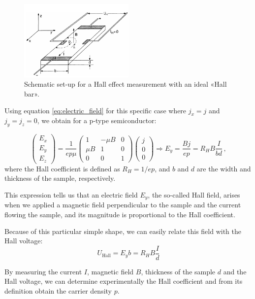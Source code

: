 \documentclass[11pt,a4paper]{article}
\begin{document}
\begin{figure}[ht]
\centering
\includegraphics[width=0.5\textwidth]{Hall_bar}
\caption{Schematic set-up for a Hall effect measurement with an ideal «Hall bar».\cite{ibach2009solid}}
\label{fig:Hall_bar}
\end{figure}

Using equation \eqref{eq:electric_field} for this specific case where $j_x=j$ and $j_y=j_z=0$, we obtain for a p-type semiconductor:

\begin{equation}
\begin{pmatrix}
E_x\\ E_y\\ E_z
\end{pmatrix}=
\frac{1}{ep\mu}
\begin{pmatrix}
1 & -\mu B & 0 \\
\mu B & 1 & 0 \\
0 & 0 & 1
\end{pmatrix}
\begin{pmatrix}
j \\ 0 \\ 0
\end{pmatrix}\Rightarrow
E_y=\frac{Bj}{ep}=R_HB\frac{I}{bd}\,,
\end{equation}
where the Hall coefficient is defined as $R_H=1/ep$, and $b$ and $d$ are the width and thickness of the sample, respectively.

This expression tells us that an electric field $E_y$, the so-called Hall field, arises when we applied a magnetic field perpendicular to the sample and the current flowing the sample, and its magnitude is proportional to the Hall coefficient.

Because of this particular simple shape, we can easily relate this field with the Hall voltage:
\begin{equation}\label{eq:Hall_voltage_simp}
U_\text{Hall}=E_yb=R_HB\frac{I}{d}
\end{equation}

By measuring the current $I$, magnetic field $B$, thickness of the sample $d$ and the Hall voltage, we can determine experimentally the Hall coefficient and from its definition obtain the carrier density $p$.
\end{document}
